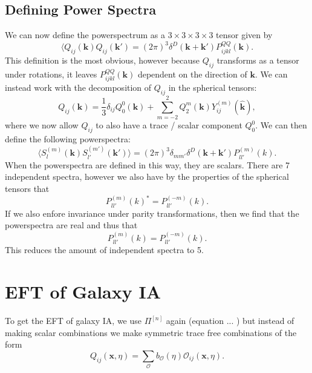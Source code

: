 \documentclass[11pt]{article}
\begin{document}
\subsection{Defining Power Spectra}
We can now define the powerspectrum as a $3 \times 3 \times 3 \times 3$ tensor given by
\begin{equation}
    \langle Q_{ij}(\mathbf k)Q_{ij}(\mathbf k') = (2 \pi)^3\delta^D(\mathbf k + \mathbf k')P_{ijkl}^{QQ}(\mathbf k).
\end{equation}
This definition is the most obvious, however because $Q_{ij}$ transforms as a tensor under rotations, it leaves $P_{ijkl}^{QQ}(\mathbf k)$ dependent on the direction of $\mathbf k$. We can instead work with the decomposition of $Q_{ij}$ in the spherical tensors:
\begin{equation}
    Q_{ij}(\mathbf k) = \frac{1}{3}\delta_{ij}Q_0^0(\mathbf k) + \sum_{m=-2}^2Q_2^m(\mathbf k)Y_{ij}^{(m)}(\hat{\mathbf k}),
\end{equation}
where we now allow $Q_{ij}$ to also have a trace / scalar component $Q_0^0$. %
We can then define the following powerspectra:
\begin{equation}
    \langle S_l^{(m)}(\mathbf k)S_{l'}^{(m')}(\mathbf k')\rangle = (2\pi)^3\delta_{mm'}\delta^D(\mathbf k + \mathbf k')P^{(m)}_{ll'}(k).
\end{equation}
When the powerspectra are defined in this way, they are scalars. There are 7 independent spectra, however we also have by the properties of the spherical tensors that
\begin{equation}
    P_{ll'}^{(m)}(k)^*=P_{ll'}^{(-m)}(k).
\end{equation}
If we also enfore invariance under parity transformations, then we find that the powerspectra are real and thus that
\begin{equation}
    P^{(m)}_{ll'}(k)=P^{(-m)}_{ll'}(k).
\end{equation}
This reduces the amount of independent spectra to 5. %





\section{EFT of Galaxy IA}
To get the EFT of galaxy IA, we use $\Pi^{[n]}$ again (equation ... %
) but instead of making scalar combinations we make symmetric trace free combinations of the form
\begin{equation}
    Q_{ij}(\mathbf x, \eta) = \sum_{\mathcal O}b_{\mathcal O}(\eta)\mathcal O_{ij}(\mathbf x, \eta).
\end{equation}

\label{sec:galaxyintrinsicalignment}



\printbibliography
\end{document}
